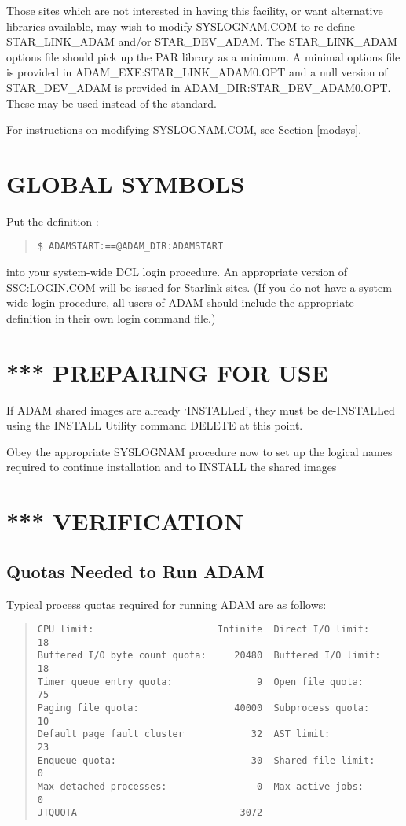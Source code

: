 Those sites which are not interested in having this facility, or want
alternative libraries available, may wish to modify SYSLOGNAM.COM to re-define
STAR\_LINK\_ADAM and/or STAR\-\_DEV\-\_ADAM.
The STAR\-\_LINK\-\_ADAM options file should pick up the PAR library as a
minimum.
A minimal options file is provided in ADAM\_EXE:\-STAR\_LINK\_ADAM0\-.OPT
and a null version of STAR\-\_DEV\-\_ADAM is provided in
ADAM\-\_DIR:\-STAR\-\_DEV\-\_ADAM0\-.OPT. These may be used instead of the
standard.

For instructions on modifying SYSLOGNAM.COM, see Section \ref{modsys}.

\section{GLOBAL SYMBOLS}
Put the definition :
\small \begin{quote}
\begin{verbatim}
$ ADAMSTART:==@ADAM_DIR:ADAMSTART
\end{verbatim}
\end{quote} \normalsize
into your system-wide DCL login procedure. An appropriate
version of SSC:LOGIN.COM will be issued for Starlink sites.
(If you do not have a system-wide login procedure,
all users of ADAM should include the appropriate definition in their
own login command file.)

\section{*** PREPARING FOR USE}
If ADAM shared images are already `INSTALLed', they must be de-INSTALLed
using the INSTALL Utility command DELETE at this point.

Obey the appropriate SYSLOGNAM procedure now to set up the logical names
required to continue installation and to INSTALL the shared images

\section{*** VERIFICATION}
\subsection{Quotas Needed to Run ADAM}
\label{quotas}
Typical process quotas required for running ADAM are as follows:
\small \begin{quote}
\begin{verbatim}
CPU limit:                      Infinite  Direct I/O limit:       18
Buffered I/O byte count quota:     20480  Buffered I/O limit:     18
Timer queue entry quota:               9  Open file quota:        75
Paging file quota:                 40000  Subprocess quota:       10
Default page fault cluster            32  AST limit:              23
Enqueue quota:                        30  Shared file limit:       0
Max detached processes:                0  Max active jobs:         0
JTQUOTA                             3072
\end{verbatim}
\end{quote} \normalsize

